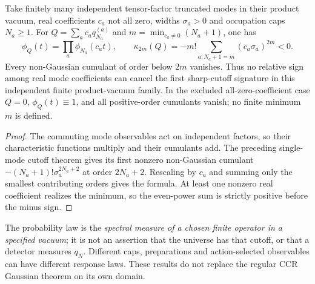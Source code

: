 \documentclass[12pt,a4paper]{article}
\begin{document}
\begin{theorem}
\label{p4c:thm:v349-multimode-first-cumulant}
Take finitely many independent tensor-factor truncated modes
in their product vacuum, real coefficients $c_a$ not all zero, widths
$\sigma_a>0$ and occupation caps $N_a\ge1$.  For
$Q=\sum_a c_aq_{N_a}^{(a)}$ and
$m=\min_{c_a\ne0}(N_a+1)$, one has
\[
 \phi_Q(t)=\prod_a\phi_{N_a}(c_at),\qquad
 \boxed{\kappa_{2m}(Q)=
 -m!\sum_{a:N_a+1=m}(c_a\sigma_a)^{2m}<0}.
\]
Every non-Gaussian cumulant of order below $2m$ vanishes.
Thus no relative sign among real mode coefficients can
cancel the first sharp-cutoff signature in this independent
finite product-vacuum family. In the excluded all-zero-coefficient case
\(Q=0\), \(\phi_Q(t)\equiv1\), and all positive-order cumulants
vanish; no finite minimum \(m\) is defined.
\end{theorem}
\begin{proof}
The commuting mode observables act on independent factors,
so their characteristic functions multiply and their
cumulants add.  The preceding single-mode cutoff theorem
gives its first nonzero non-Gaussian cumulant
$-(N_a+1)!\sigma_a^{2N_a+2}$ at order $2N_a+2$.
Rescaling by $c_a$ and summing only the smallest contributing
orders gives the formula.  At least one nonzero real
coefficient realizes the minimum, so the even-power sum is
strictly positive before the minus sign.
\end{proof}

\begin{remark}
\label{p4c:rem:v349-hermite-physical-guard}
The probability law is the \emph{spectral measure of a chosen
finite operator in a specified vacuum}; it is not an assertion
that the universe has that cutoff, or that a detector measures
$q_N$.  Different caps, preparations and action-selected
observables can have different response laws.  These results
do not replace the regular CCR Gaussian theorem on its own domain.
\end{remark}

\printbibliography
\end{document}
